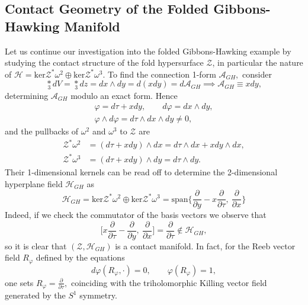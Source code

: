 \documentclass[a4paper,12pt, onecolumn, notitlepage]{article}
\theoremstyle{definition}
\theoremstyle{remark}
\newcommand{\w}{\omega}
\newcommand{\ddt}[1]{\frac{\partial #1}{\partial \tau}}
\newcommand{\dd}[2]{\frac{\partial #1}{\partial #2}}
\newcommand{\vp}{\varphi}
\begin{document}
\subsection{Contact Geometry of the Folded Gibbons-Hawking Manifold}	
Let us continue our investigation into the folded Gibbons-Hawking example by studying the contact structure of the fold hypersurface $\mathcal{Z}$, in particular the nature of $\mathcal{H}=\text{ker}\mathcal{Z}^{\ast}\w^{2}\oplus\text{ker}\mathcal{Z}^{\ast}\w^{3}.$ To find the connection 1-form $\mathcal{A}_{GH},$ consider
\begin{equation}
	\underset{3}\ast dV=\underset{3}\ast dz = dx\wedge dy=d(xdy)=d\mathcal{A}_{GH} \implies \mathcal{A}_{GH} \equiv xdy,
\end{equation}
determining $\mathcal{A}_{GH}$ modulo an exact form. Hence
\begin{gather*}
	\vp = d\tau + xdy,\qquad d\vp = dx\wedge dy,\\  \vp\wedge d\vp = d\tau\wedge dx\wedge dy \neq 0,
\end{gather*}
and the pullbacks of $\w^{2}$ and $\w^{3}$ to $\mathcal{Z}$ are
\begin{align*}
	\mathcal{Z}^{\ast}\w^{2} &= (d\tau + xdy)\wedge dx = d\tau\wedge dx + x dy\wedge dx,\\ \mathcal{Z}^{\ast}\w^{3} &= (d\tau + xdy)\wedge dy = d\tau\wedge dy.
\end{align*}
Their 1-dimensional kernels can be read off to determine the 2-dimensional hyperplane field $\mathcal{H}_{GH}$ as
\begin{equation*}
	\mathcal{H}_{GH}=\text{ker}\mathcal{Z}^{\ast}\w^{2}\oplus\text{ker}\mathcal{Z}^{\ast}\w^{3}=\text{span}\bigg\{\dd{}{y}-x\dd{}{\tau},\ \dd{}{x} \bigg\}
\end{equation*}
Indeed, if we check the commutator of the basis vectors we observe that
\begin{equation*}
	\bigg[ x\dd{}{\tau}-\dd{}{y},\ \dd{}{x}\bigg] = \dd{}{\tau}\not\in\mathcal{H}_{GH},
\end{equation*}
so it is clear that $(\mathcal{Z},\mathcal{H}_{GH})$ is a contact manifold. In fact, for the Reeb vector field $R_{\vp}$ defined by the equations
\begin{equation}
	d\vp(R_{\vp},\cdot) = 0,\qquad
	\vp(R_{\vp})  = 1,
\end{equation}
one sets $R_{\vp}= \ddt{},$ coinciding with the triholomorphic Killing vector field generated by the $S^{1}$ symmetry.
\end{document}
